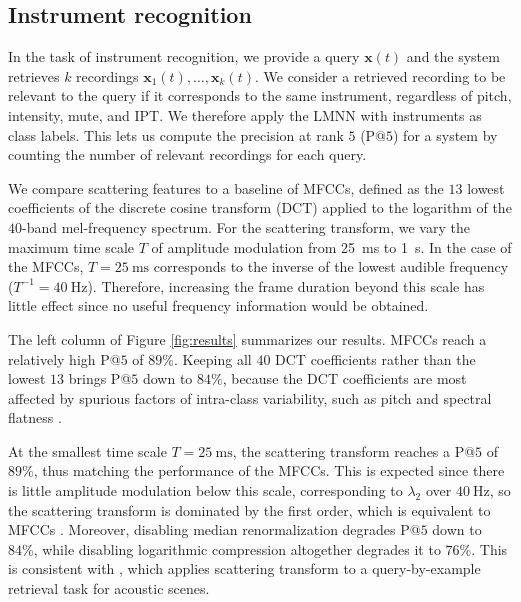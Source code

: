 

\subsection{Instrument recognition}

In the task of instrument recognition, we provide a query $\boldsymbol{x} (t)$ and the system retrieves $k$ recordings $\boldsymbol{x}_1 (t), \ldots, \boldsymbol{x}_k (t)$.
We consider a retrieved recording to be relevant to the query if it corresponds to the same instrument, regardless of pitch, intensity, mute, and IPT. We therefore apply the LMNN with instruments as class labels. This lets us compute the precision at rank $5$ (P@$5$) for a system by counting the number of relevant recordings for each query.

We compare scattering features to a baseline of MFCCs, defined as the $13$ lowest coefficients of the discrete cosine transform (DCT) applied to the logarithm of the $40$-band mel-frequency spectrum.
For the scattering transform, we vary the maximum time scale $T$ of amplitude modulation from \SI{25}{\milli\second} to \SI{1}{\second}.
In the case of the MFCCs, $T=\SI{25}{\milli\second}$ corresponds to the inverse of the lowest audible frequency ($T^{-1}=\SI{40}{\Hz}$).
Therefore, increasing the frame duration beyond this scale has little effect since no useful frequency information would be obtained.

The left column of Figure \ref{fig:results} summarizes our results.
MFCCs reach a relatively high P@$5$ of $89\%$.
Keeping all $40$ DCT coefficients rather than the lowest $13$ brings P@$5$ down to $84\%$, because the DCT coefficients are most affected by spurious factors of intra-class variability, such as pitch and spectral flatness \cite[subsection 2.3.3]{lostanlen2017phd}.

At the smallest time scale $T=\SI{25}{\milli\second}$, the scattering transform reaches a P@$5$ of $89\%$, thus matching the performance of the MFCCs.
This is expected since there is little amplitude modulation below this scale, corresponding to $\lambda_2$ over $\SI{40}{\Hz}$, so the scattering transform is dominated by the first order, which is equivalent to MFCCs \cite{anden2014taslp}.
Moreover, disabling median renormalization degrades P@$5$ down to $84\%$, while disabling logarithmic compression altogether degrades it to $76\%$.
This is consistent with \cite{lostanlen2018eurasip}, which applies scattering transform to a query-by-example retrieval task for acoustic scenes.

